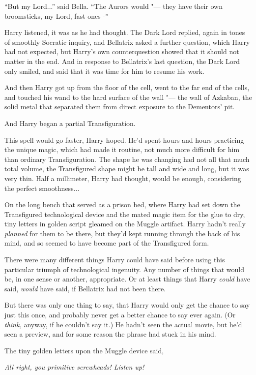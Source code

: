 ``But my Lord...'' said Bella. ``The Aurors would "--- they have their
own broomsticks, my Lord, fast ones -''

Harry listened, it was as he had thought. The Dark Lord replied, again
in tones of smoothly Socratic inquiry, and Bellatrix asked a further
question, which Harry had not expected, but Harry's own counterquestion
showed that it should not matter in the end. And in response to
Bellatrix's last question, the Dark Lord only smiled, and said that it
was time for him to resume his work.

And then Harry got up from the floor of the cell, went to the far end of
the cells, and touched his wand to the hard surface of the wall "--- the
wall of Azkaban, the solid metal that separated them from direct
exposure to the Dementors' pit.

And Harry began a partial Transfiguration.

This spell would go faster, Harry hoped. He'd spent hours and hours
practicing the unique magic, which had made it routine, not much more
difficult for him than ordinary Transfiguration. The shape he was
changing had not all that much total volume, the Transfigured shape
might be tall and wide and long, but it was very thin. Half a
millimeter, Harry had thought, would be enough, considering the perfect
smoothness...

On the long bench that served as a prison bed, where Harry had set down
the Transfigured technological device and the mated magic item for the
glue to dry, tiny letters in golden script gleamed on the Muggle
artifact. Harry hadn't really \emph{planned} for them to be there, but
they'd kept running through the back of his mind, and so seemed to have
become part of the Transfigured form.

There were many different things Harry could have said before using this
particular triumph of technological ingenuity. Any number of things that
would be, in one sense or another, appropriate. Or at least things that
Harry \emph{could} have said, \emph{would} have said, if Bellatrix had
not been there.

But there was only one thing to say, that Harry would only get the
chance to say just this once, and probably never get a better chance to
say ever again. (Or \emph{think,} anyway, if he couldn't say it.) He
hadn't seen the actual movie, but he'd seen a preview, and for some
reason the phrase had stuck in his mind.

The tiny golden letters upon the Muggle device said,

\emph{All right, you primitive screwheads! Listen up!}
